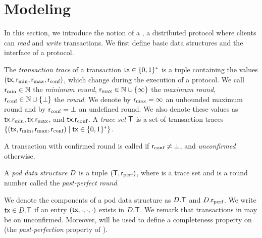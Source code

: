 \section{Modeling \podtm} \label{sec:pod-model}
In this section, we introduce the notion of a \podtm, a distributed protocol where clients can \emph{read} and \emph{write} transactions.
We first define basic data structures and the interface of a \podtm protocol.

\begin{definition}
    The \emph{transaction trace} of a transaction $\textsf{tx} \in \{ 0, 1\}^*$ is a tuple containing the values $(\textsf{tx}, \textsf{r}_\text{min}, \textsf{r}_\text{max}, \textsf{r}_\text{conf})$, which change during the execution of a \podtm protocol.
    We call $\textsf{r}_\text{min} \in \mathbb{N}$ the \emph{minimum round}, $\textsf{r}_\text{max} \in \mathbb{N} \cup \{\infty\}$ the \emph{maximum round},
    $\textsf{r}_\text{conf} \in \mathbb{N} \cup \{\bot\}$ the \emph{\confirmed round}.
    We denote by $\textsf{r}_\text{max}=\infty$ an unbounded maximum round and by $\textsf{r}_\text{conf}=\bot$ an undefined \confirmed round.
    We also denote these values as $\textsf{tx}.\textsf{r}_\text{min}, \textsf{tx}.\textsf{r}_\text{max}$, and $\textsf{tx}.\textsf{r}_\text{conf}$.
    A \emph{trace set} $\textsf{T}$ is a set of transaction traces $\{(\textsf{tx}, \textsf{r}_\text{min}, \textsf{r}_\text{max}, \textsf{r}_\text{conf}) \mid \textsf{tx} \in \{ 0, 1\}^*\}$.
\end{definition}

\begin{definition}
    A transaction with confirmed round \rconf is called \emph{\confirmed} if $\textsf{r}_\text{conf} \neq \bot$, and \emph{unconfirmed} otherwise.
\end{definition}



\begin{definition}
    A \emph{pod data structure} $D$ is a tuple $(\textsf{T}, \textsf{r}_\text{perf})$, where \txSet is a trace set and \rperf is a round number called the \emph{past-perfect round}.
\end{definition}
We denote the components of a pod data structure as $D.\textsf{T}$ and $D.\textsf{r}_\text{perf}$.
We write $\textsf{tx} \in D.\textsf{T}$ if an entry $(\textsf{tx}, \cdot, \cdot, \cdot)$ exists in $D.\textsf{T}$.
We remark that transactions in \txSet may be \confirmed on unconfirmed. Moreover, \rperf will be used to define a completeness property on \txSet (the \emph{past-perfection} property of \podtm).

